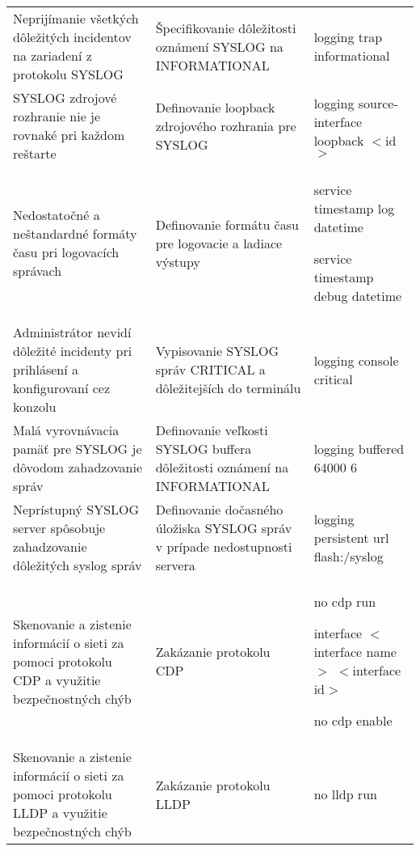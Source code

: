 \begin{longtable}[!htbp]{|L{10em}L{10em}>{\selectfont}L{34em}|}
	
	
	
	Neprijímanie všetkých dôležitých incidentov na zariadení z protokolu SYSLOG	&Špecifikovanie dôležitosti oznámení SYSLOG na INFORMATIONAL	&logging trap informational\\
	
	
	
	
	 SYSLOG zdrojové rozhranie nie je rovnaké pri každom reštarte	& Definovanie loopback zdrojového rozhrania pre SYSLOG	&logging source-interface loopback $<$id$>$\\
	
	
	
	Nedostatočné a neštandardné formáty času pri logovacích správach	&Definovanie formátu času pre logovacie a ladiace výstupy	&service timestamp log datetime
	
	service timestamp debug datetime\\
	
	
	
	
	 Administrátor nevidí dôležité incidenty pri prihlásení a konfigurovaní cez konzolu	&Vypisovanie SYSLOG správ CRITICAL a dôležitejších do terminálu	&logging console critical\\
	
	
	
	
	Malá vyrovnávacia pamäť pre SYSLOG je dôvodom zahadzovanie správ	&Definovanie veľkosti SYSLOG buffera dôležitosti oznámení na INFORMATIONAL	&logging buffered 64000 6\\
	
	
	
	
	 Neprístupný SYSLOG server spôsobuje zahadzovanie dôležitých syslog správ	&Definovanie dočasného úložiska SYSLOG správ v prípade nedostupnosti servera	&logging persistent url flash:/syslog\\
	
	
	
	
	Skenovanie a zistenie informácií o sieti za pomoci protokolu CDP a využitie bezpečnostných chýb	&Zakázanie protokolu CDP	&no cdp run
	
	
	interface $<$interface name$>$ $<$interface id$>$ 
	
	\hspace{0.5em}no cdp enable\\
	
	
	
	
	 Skenovanie a zistenie informácií o sieti za pomoci protokolu LLDP a využitie bezpečnostných chýb	&Zakázanie protokolu LLDP	&no lldp run
	

\end{longtable}
